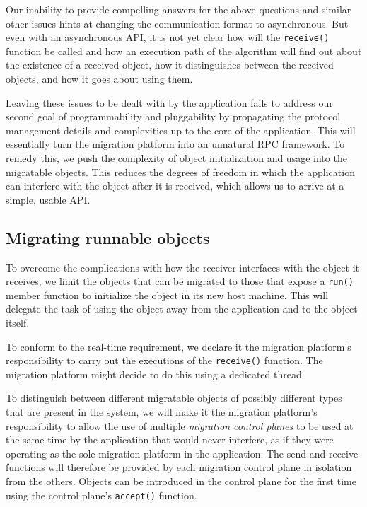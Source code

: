 Our inability to provide compelling answers for the above questions
and similar other issues hints
at changing the communication format to asynchronous. But even with an
asynchronous API, it is not yet clear how will the \texttt{receive()}
function be called and how an execution path of the algorithm will find
out about the existence of a received object, how it distinguishes between
the received objects, and how it goes about using them.

Leaving these issues to be dealt with by the application
fails to address our second goal of programmability and pluggability
by propagating the protocol management details and complexities up to the
core of the application. This will essentially turn the migration
platform into an unnatural RPC framework. To remedy this, we push the
complexity of object initialization and usage into the migratable
objects. This reduces the degrees of freedom in which the application
can interfere with the object after it is received, which allows us to
arrive at a simple, usable API.

\subsection{Migrating runnable objects}
To overcome the complications with how the receiver interfaces with the
object it receives, we limit the objects that can be migrated to those
that expose a \texttt{run()} member function to
initialize the object in its new host machine. This will delegate the task
of using the object away from the application and to the object itself.

To conform to the real-time requirement, we declare it the migration
platform's responsibility to carry out the executions of the
\texttt{receive()} function. The migration platform might decide to do
this using a dedicated thread.

To distinguish between different migratable objects of possibly different
types that are present in the system, we will make it the migration
platform's responsibility to allow the use of multiple
\emph{migration control planes} to be used at the same time by the
application that would never interfere, as if they were operating
as the sole migration platform in the application.
The send and receive functions
will therefore be provided by each migration control plane in isolation
from the others. Objects can be introduced in the control plane for the
first time using the control plane's \texttt{accept()} function.

